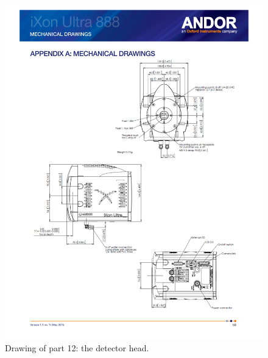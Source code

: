 \begin{figure}
\begin{center}
\includegraphics[angle=0,width=0.9\linewidth]{figures/huitzi-f20-part-12.pdf}
\end{center}
\caption{Drawing of part 12: the detector head.}
\label{figure:huitzi-f20-part-12}
\end{figure}

